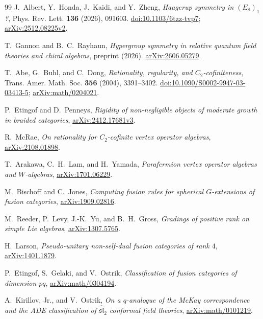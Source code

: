 \begin{thebibliography}{99}
J.~Albert, Y.~Honda, J.~Kaidi, and Y.~Zheng,
\emph{Haagerup symmetry in $(E_8)_1$?},
Phys. Rev. Lett. \textbf{136} (2026), 091603.
\href{https://doi.org/10.1103/6tzz-tvp7}{doi:10.1103/6tzz-tvp7};
\href{https://arxiv.org/abs/2512.08225v2}{arXiv:2512.08225v2}.

T.~Gannon and B.~C.~Rayhaun,
\emph{Hypergroup symmetry in relative quantum field theories and chiral algebras},
preprint (2026).
\href{https://arxiv.org/abs/2606.05279}{arXiv:2606.05279}.

T.~Abe, G.~Buhl, and C.~Dong,
\emph{Rationality, regularity, and $C_2$-cofiniteness},
Trans. Amer. Math. Soc. \textbf{356} (2004), 3391--3402.
\href{https://doi.org/10.1090/S0002-9947-03-03413-5}{doi:10.1090/S0002-9947-03-03413-5};
\href{https://arxiv.org/abs/math/0204021}{arXiv:math/0204021}.

P.~Etingof and D.~Penneys,
\emph{Rigidity of non-negligible objects of moderate growth in braided categories},
\href{https://arxiv.org/abs/2412.17681v3}{arXiv:2412.17681v3}.

R.~McRae,
\emph{On rationality for $C_2$-cofinite vertex operator algebras},
\href{https://arxiv.org/abs/2108.01898}{arXiv:2108.01898}.

T.~Arakawa, C.~H.~Lam, and H.~Yamada,
\emph{Parafermion vertex operator algebras and $W$-algebras},
\href{https://arxiv.org/abs/1701.06229}{arXiv:1701.06229}.

M.~Bischoff and C.~Jones,
\emph{Computing fusion rules for spherical $G$-extensions of fusion categories},
\href{https://arxiv.org/abs/1909.02816}{arXiv:1909.02816}.

M.~Reeder, P.~Levy, J.-K.~Yu, and B.~H.~Gross,
\emph{Gradings of positive rank on simple Lie algebras},
\href{https://arxiv.org/abs/1307.5765}{arXiv:1307.5765}.

H.~Larson,
\emph{Pseudo-unitary non-self-dual fusion categories of rank $4$},
\href{https://arxiv.org/abs/1401.1879}{arXiv:1401.1879}.

P.~Etingof, S.~Gelaki, and V.~Ostrik,
\emph{Classification of fusion categories of dimension $pq$},
\href{https://arxiv.org/abs/math/0304194}{arXiv:math/0304194}.

A.~Kirillov, Jr., and V.~Ostrik,
\emph{On a $q$-analogue of the McKay correspondence and the ADE classification
of $\widehat{\mathfrak{sl}}_2$ conformal field theories},
\href{https://arxiv.org/abs/math/0101219}{arXiv:math/0101219}.


\end{thebibliography}
